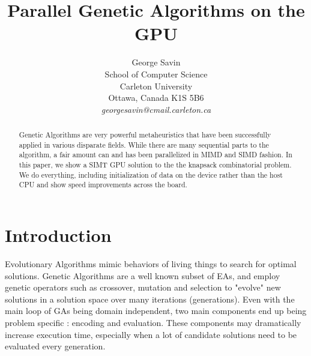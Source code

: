\documentclass[11pt]{article}       %
\begin{document}


\title{Parallel Genetic Algorithms on the GPU}


\author{
George Savin\\
School of Computer Science\\
Carleton University\\
Ottawa, Canada K1S 5B6\\
{\em georgesavin@cmail.carleton.ca}
} %

\maketitle

\begin{abstract}
Genetic Algorithms are very powerful metaheuristics that have been successfully applied in  various disparate fields. While there are many sequential parts to the algorithm, a fair amount can and has been parallelized in MIMD and SIMD fashion. In this paper, we show a SIMT GPU solution to the the knapsack combinatorial problem. We do everything, including initialization of data on the device rather than the host CPU and show speed improvements across the board.
\end{abstract}

\section{Introduction} \label{intro}
Evolutionary Algorithms mimic behaviors of living things to search for optimal solutions. Genetic Algorithms are a well known subset of EAs, and employ genetic operators such as crossover, mutation and selection to "evolve" new solutions in a solution space over many iterations (generations). Even with the main loop of GAs being domain independent, two main components end up being problem specific : encoding and evaluation. These components may dramatically increase execution time, especially when a lot of candidate solutions need to be evaluated every generation.
\end{document}

